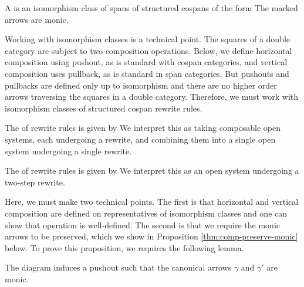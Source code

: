 \documentclass{amsart}
\begin{document}
\begin{definition}[Rewrite]
  A  is an
  isomorphism class of spans of structured cospans of the
  form  The marked arrows are
  monic.
\end{definition}

Working with isomorphism classes is a technical point.  The
squares of a double category are subject to two composition
operations. Below, we define horizontal composition using
pushout, as is standard with cospan categories, and vertical
composition uses pullback, as is standard in span
categories.  But pushouts and pullbacks are defined only up
to isomorphism and there are no higher order arrows
traversing the squares in a double category. Therefore, we
must work with isomorphism classes of structured cospan
rewrite rules.

The  of rewrite rules is given by
 We interpret this as
taking composable open systems, each undergoing a rewrite,
and combining them into a single open system undergoing a
single rewrite.

The  of rewrite rules is given by
 We interpret this as an open
system undergoing a two-step rewrite.  

Here, we must make two technical points. The first is that
horizontal and vertical composition are defined on
representatives of isomorphism classes and one can show that
operation is well-defined. The second is that we require the
monic arrows to be preserved, which we show in Proposition
\ref{thm:comp-preserve-monic} below. To prove this
proposition, we requires the following lemma.

\begin{lemma}
  \label{thm:quotient-map-monic-pushout}
  The diagram 
  induces a pushout
   such that the
  canonical arrows $ \gamma $ and $ \gamma' $ are monic.
\end{lemma}
\end{document}
